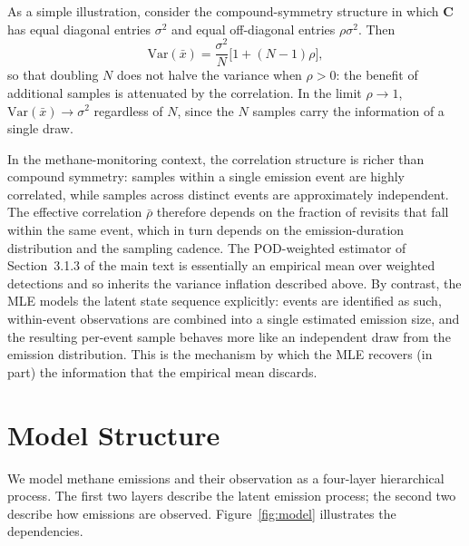 \documentclass[11pt]{article}
\newcommand{\new}[1]{{\color{blue}#1}}
\newcommand{\Var}{\mathrm{Var}}
\begin{document}
\new{As a simple illustration, consider the compound-symmetry structure in which $\mathbf{C}$ has equal diagonal entries $\sigma^2$ and equal off-diagonal entries $\rho \sigma^2$. Then
\begin{equation}
    \Var(\bar x) = \frac{\sigma^2}{N}\bigl[1 + (N-1)\rho\bigr],
\end{equation}
so that doubling $N$ does not halve the variance when $\rho > 0$: the benefit of additional samples is attenuated by the correlation. In the limit $\rho \to 1$, $\Var(\bar x) \to \sigma^2$ regardless of $N$, since the $N$ samples carry the information of a single draw.}

\new{In the methane-monitoring context, the correlation structure is richer than compound symmetry: samples within a single emission event are highly correlated, while samples across distinct events are approximately independent. The effective correlation $\bar\rho$ therefore depends on the fraction of revisits that fall within the same event, which in turn depends on the emission-duration distribution and the sampling cadence. The POD-weighted estimator of Section~3.1.3 of the main text is essentially an empirical mean over weighted detections and so inherits the variance inflation described above. By contrast, the MLE models the latent state sequence explicitly: events are identified as such, within-event observations are combined into a single estimated emission size, and the resulting per-event sample behaves more like an independent draw from the emission distribution. This is the mechanism by which the MLE recovers (in part) the information that the empirical mean discards.}

\section{Model Structure}
\label{sec:model}

We model methane emissions and their observation as a four-layer hierarchical process. The first two layers describe the latent emission process; the second two describe how emissions are observed. Figure~\ref{fig:model} illustrates the dependencies.
\end{document}
